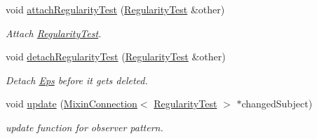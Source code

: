 \begin{DoxyCompactItemize}
void \hyperlink{classSpacy_1_1Mixin_1_1RegularityTest_aeb6598687d622ef266d1ed515d2b42bf_aeb6598687d622ef266d1ed515d2b42bf}{attach\+Regularity\+Test} (\hyperlink{classSpacy_1_1Mixin_1_1RegularityTest}{Regularity\+Test} \&other)
\begin{DoxyCompactList}\small\item\em Attach \hyperlink{classSpacy_1_1Mixin_1_1RegularityTest}{Regularity\+Test}. \end{DoxyCompactList}\item 
\hypertarget{classSpacy_1_1Mixin_1_1RegularityTest_a289d6422bd82864d661bdbcfc7dc321e}{}void \hyperlink{classSpacy_1_1Mixin_1_1RegularityTest_a289d6422bd82864d661bdbcfc7dc321e}{detach\+Regularity\+Test} (\hyperlink{classSpacy_1_1Mixin_1_1RegularityTest}{Regularity\+Test} \&other)\label{classSpacy_1_1Mixin_1_1RegularityTest_a289d6422bd82864d661bdbcfc7dc321e}

\begin{DoxyCompactList}\small\item\em Detach \hyperlink{classSpacy_1_1Mixin_1_1Eps}{Eps} before it gets deleted. \end{DoxyCompactList}\item 
\hypertarget{classSpacy_1_1Mixin_1_1RegularityTest_ae3bfc55bec9fe3068adffb6d24b3b964}{}void \hyperlink{classSpacy_1_1Mixin_1_1RegularityTest_ae3bfc55bec9fe3068adffb6d24b3b964}{update} (\hyperlink{classSpacy_1_1Mixin_1_1MixinConnection}{Mixin\+Connection}$<$ \hyperlink{classSpacy_1_1Mixin_1_1RegularityTest}{Regularity\+Test} $>$ $\ast$changed\+Subject)\label{classSpacy_1_1Mixin_1_1RegularityTest_ae3bfc55bec9fe3068adffb6d24b3b964}

\begin{DoxyCompactList}\small\item\em update function for observer pattern. \end{DoxyCompactList}\end{DoxyCompactItemize}
